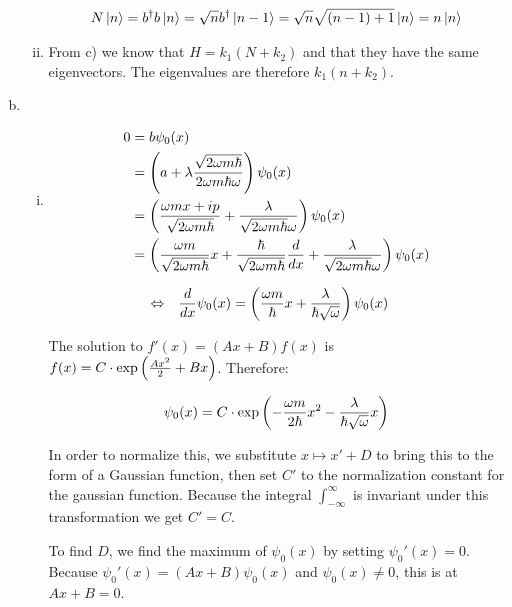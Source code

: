 \documentclass[a4paper,german,12pt,smallheadings]{scrartcl}
\begin{document}
\begin{enumerate}[a)]
\begin{enumerate}[i)]
    \begin{align*}
      N \ket{n} = b^\dagger b \ket{n} = \sqrt{n} b^\dagger \ket{n-1} = \sqrt{n} \sqrt{(n-1)+1} \ket{n} = n \ket{n}
    \end{align*}

  \item
    From c) we know that $H = k_1 (N + k_2)$ and that they have the same
    eigenvectors. The eigenvalues are therefore $k_1(n + k_2)$.

\end{enumerate}
\item
  \begin{enumerate}[i)]
    \item
      \begin{align*}
        0 &= b \psi_0(x) \\
          &= \del{a + \lambda \frac{\sqrt{2 \omega m \hbar}}{2 \omega m \hbar \omega}} \psi_0(x) \\
          &= \del{\frac{\omega m x + i p}{\sqrt{2 \omega m \hbar}} + \frac{\lambda}{\sqrt{2 \omega m \hbar} \omega}} \psi_0(x) \\
          &= \del{\frac{\omega m}{\sqrt{2 \omega m \hbar}} x + \frac{\hbar}{\sqrt{2 \omega m \hbar}} \frac{d}{dx} + \frac{\lambda}{\sqrt{2 \omega m \hbar} \omega}} \psi_0(x)
      \end{align*}

      \begin{align*}
        \Leftrightarrow\quad&
        \frac{d}{dx} \psi_0(x) = \del{\frac{\omega m}{\hbar} x + \frac{\lambda}{\hbar \sqrt{\omega}}} \psi_0(x)
      \end{align*}

      The solution to $f'(x) = (Ax+B) f(x)$ is $f(x) = C \cdot \exp\del{\frac{Ax^2}{2} + Bx}$. Therefore:

      \begin{align*}
        \psi_0(x) = C \cdot \exp \del{-\frac{\omega m}{2 \hbar} x^2 - \frac{\lambda}{\hbar \sqrt{\omega}} x}
      \end{align*}

      In order to normalize this, we substitute $x \mapsto x' + D$ to bring
      this to the form of a Gaussian function, then set $C'$ to the
      normalization constant for the gaussian function. Because the integral
      $\int_{-\infty}^\infty$ is invariant under this transformation we get $C'
      = C$.

      To find $D$, we find the maximum of $\psi_0(x)$ by setting $\psi_0'(x) =
      0$. Because $\psi_0'(x) = (Ax+B) \psi_0(x)$ and $\psi_0(x) \neq 0$, this
      is at $Ax+B = 0$.


\end{enumerate}
\end{enumerate}
\end{document}
